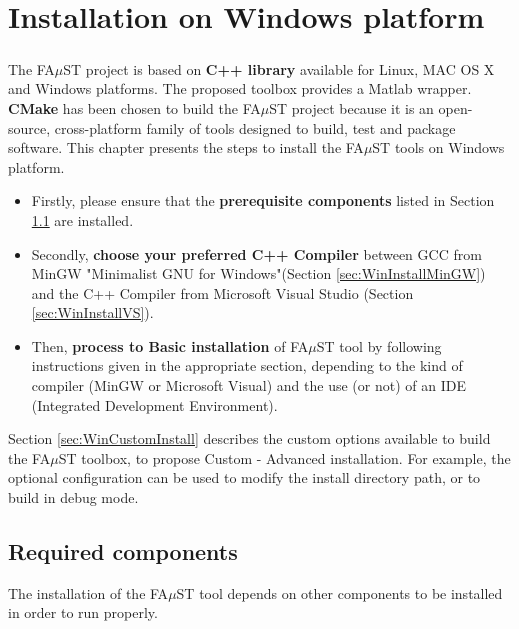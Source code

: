 \chapter{Installation on Windows platform}\label{sec:WinInstall}


\paragraph{}The FA$\mu$ST project is based on \textbf{C++ library} available for Linux, MAC OS X and Windows platforms. The proposed toolbox provides a Matlab wrapper. \textbf{CMake} has been chosen to build the FA$\mu$ST project because it is an open-source, cross-platform family of tools designed to build, test and package software. This chapter presents the steps to install the FA$\mu$ST tools on Windows platform.

\begin{itemize}
\item Firstly, please ensure that the \textbf{prerequisite components} listed in Section \ref{sec:WinRequired} are installed. 

\item Secondly, \textbf{choose your preferred C++ Compiler} between GCC from MinGW "Minimalist GNU for Windows"(Section \ref{sec:WinInstallMinGW}) and the C++ Compiler from Microsoft Visual Studio (Section \ref{sec:WinInstallVS}). 

\item Then, \textbf{process to Basic installation} of FA$\mu$ST tool by following instructions given in the appropriate section, depending to the kind of compiler (MinGW or Microsoft Visual) and the use (or not) of an IDE (Integrated Development Environment). 
\end{itemize}




Section \ref{sec:WinCustomInstall} describes the custom options available to build the FA$\mu$ST toolbox, to propose Custom - Advanced installation. For example, the optional configuration can be used to modify the install directory path, or to build in debug mode.  


\section{Required components}\label{sec:WinRequired}
The installation of the FA$\mu$ST tool depends on other components to be installed in order to run properly. 

